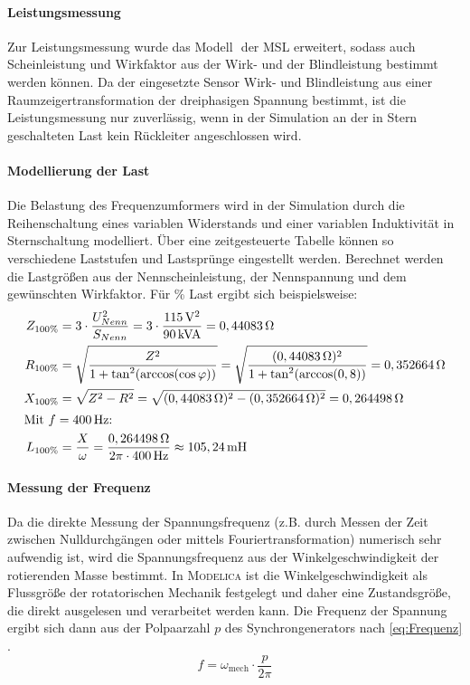 \paragraph{Leistungsmessung}\label{leistungsmessung}
Zur Leistungsmessung wurde das Modell ­ der MSL erweitert, sodass auch Scheinleistung und Wirkfaktor aus der Wirk- und der Blindleistung bestimmt werden können. Da der eingesetzte Sensor Wirk- und Blindleistung aus einer Raumzeigertransformation der dreiphasigen Spannung bestimmt, ist die Leistungsmessung nur zuverlässig, wenn in der Simulation an der in Stern geschalteten Last kein Rückleiter angeschlossen wird.

\paragraph{Modellierung der Last}\label{parametrierung-der-last}
Die Belastung des Frequenzumformers wird in der Simulation durch die Reihenschaltung eines variablen Widerstands und einer variablen Induktivität in Sternschaltung modelliert. Über eine zeitgesteuerte Tabelle können so verschiedene Laststufen und Lastsprünge eingestellt werden. Berechnet werden die Lastgrößen aus der Nennscheinleistung, der Nennspannung und dem gewünschten Wirkfaktor. Für \unit[100]{\%} Last ergibt sich beispielsweise:
\begin{align}
Z_{100\%} &= 3\cdot\frac{U_{Nenn}^2}{S_{Nenn}}= 3\cdot \frac{\unit[115]{V^2}}{\unit[90]{kVA}} = \unit[0,44083]{\Omega} \\
R_{100\%} &= \sqrt{\frac{Z^2}{1+\tan^2(\arccos(\cos\varphi))}}=\sqrt{\frac{(\unit[0,44083]{\Omega})^2}{1+\tan^2(\arccos(0,8))}}=\unit[0,352664]{\Omega} \\
X_{100\%} &= \sqrt{Z^2-R^2}=\sqrt{(\unit[0,44083]{\Omega})^2 - (\unit[0,352664]{\Omega})^2}=\unit[0,264498]{\Omega} \\
\intertext{Mit $f=\unit[400]{Hz}$:}
L_{100\%} &= \frac X\omega = \frac{\unit[0,264498]{\Omega}}{2\pi\cdot\unit[400]{Hz}}\approx \unit[105,24]{mH}\\
\end{align}

\paragraph{Messung der Frequenz}
Da die direkte Messung der Spannungsfrequenz (z.B. durch Messen der Zeit zwischen Nulldurchgängen oder mittels Fouriertransformation) numerisch sehr aufwendig ist, wird die Spannungsfrequenz aus der Winkelgeschwindigkeit der rotierenden Masse bestimmt. In \textsc{Modelica} ist die Winkelgeschwindigkeit  als Flussgröße der rotatorischen Mechanik festgelegt und daher eine Zustandsgröße, die direkt ausgelesen und verarbeitet werden kann. Die Frequenz der Spannung ergibt sich dann aus der Polpaarzahl $p$ des Synchrongenerators nach \cref{eq:Frequenz} .
\begin{equation}
	f = \omega_\mathrm{mech}\cdot\frac{p}{2\pi}\label{eq:Frequenz}
\end{equation}

